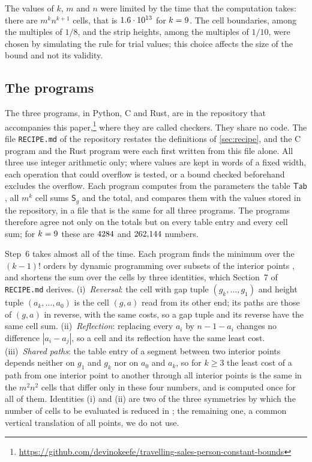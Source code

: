 The values of $k$, $m$ and $n$ were limited by the time that the computation takes: there are $m^kn^{k+1}$ cells, that is $1.6\cdot10^{13}$ for $k=9$. The cell boundaries, among the multiples of $1/8$, and the strip heights, among the multiples of $1/10$, were chosen by simulating the rule for trial values; this choice affects the size of the bound and not its validity.

\subsection{The programs}\label{sec:programs}

The three programs, in Python, C and Rust, are in the repository that accompanies this paper,\footnote{\url{https://github.com/devinokeefe/travelling-sales-person-constant-bounds}} where they are called checkers. They share no code. The file \texttt{RECIPE.md} of the repository restates the definitions of \cref{sec:recipe}, and the C program and the Rust program were each first written from this file alone. All three use integer arithmetic only; where values are kept in words of a fixed width, each operation that could overflow is tested, or a bound checked beforehand excludes the overflow. Each program computes from the parameters the table $\mathsf{Tab}$, all $m^k$ cell sums $\mathsf{S}_g$ and the total, and compares them with the values stored in the repository, in a file that is the same for all three programs. The programs therefore agree not only on the totals but on every table entry and every cell sum; for $k=9$ these are $4284$ and $262{,}144$ numbers.

 Step~6 takes almost all of the time. Each program finds the minimum over the $(k-1)!$ orders by dynamic programming over subsets of the interior points \cite{Bellman1962,HeldKarp1962}, and shortens the sum over the cells by three identities, which Section~7 of \texttt{RECIPE.md} derives. (i)~\emph{Reversal}: the cell with gap tuple $(g_k,\dots,g_1)$ and height tuple $(a_k,\dots,a_0)$ is the cell $(g,a)$ read from its other end; its paths are those of $(g,a)$ in reverse, with the same costs, so a gap tuple and its reverse have the same cell sum. (ii)~\emph{Reflection}: replacing every $a_i$ by $n-1-a_i$ changes no difference $|a_i-a_j|$, so a cell and its reflection have the same least cost. (iii)~\emph{Shared paths}: the table entry of a segment between two interior points depends neither on $g_1$ and $g_k$ nor on $a_0$ and $a_k$, so for $k\ge3$ the least cost of a path from one interior point to another through all interior points is the same in the $m^2n^2$ cells that differ only in these four numbers, and is computed once for all of them. Identities (i) and (ii) are two of the three symmetries by which the number of cells to be evaluated is reduced in \cite[Section~4.2, after~(39)]{DongCao2026}; the remaining one, a common vertical translation of all points, we do not use.

